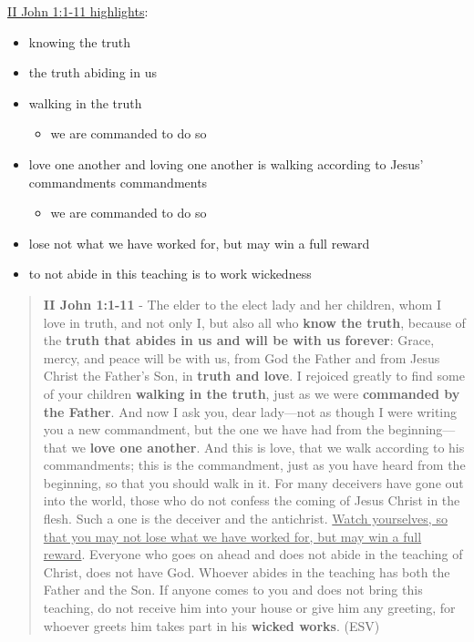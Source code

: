 \documentclass[11pt]{article}
\begin{document}
\uline{II John 1:1-11 highlights}:
\begin{itemize}
\item knowing the truth
\item the truth abiding in us
\item walking in the truth
\begin{itemize}
\item we are commanded to do so
\end{itemize}
\item love one another and loving one another is walking according to Jesus' commandments commandments
\begin{itemize}
\item we are commanded to do so
\end{itemize}
\item lose not what we have worked for, but may win a full reward
\item to not abide in this teaching is to work wickedness
\end{itemize}

\begin{quote}
\textbf{II John 1:1-11} - The elder to the elect lady and her children, whom I love in truth, and not only I, but also all who \textbf{know the truth}, because of the \textbf{truth that abides in us and will be with us forever}: Grace, mercy, and peace will be with us, from God the Father and from Jesus Christ the Father's Son, in \textbf{truth and love}.  I rejoiced greatly to find some of your children \textbf{walking in the truth}, just as we were \textbf{commanded by the Father}.  And now I ask you, dear lady—not as though I were writing you a new commandment, but the one we have had from the beginning—that we \textbf{love one another}.  And this is love, that we walk according to his commandments; this is the commandment, just as you have heard from the beginning, so that you should walk in it.  For many deceivers have gone out into the world, those who do not confess the coming of Jesus Christ in the flesh. Such a one is the deceiver and the antichrist.  \uline{Watch yourselves, so that you may not lose what we have worked for, but may win a full reward}.  Everyone who goes on ahead and does not abide in the teaching of Christ, does not have God. Whoever abides in the teaching has both the Father and the Son.  If anyone comes to you and does not bring this teaching, do not receive him into your house or give him any greeting, for whoever greets him takes part in his \textbf{wicked works}. (ESV)
\end{quote}
\end{document}
